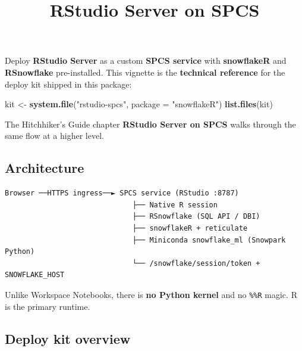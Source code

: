 \documentclass[
]{article}
\title{RStudio Server on SPCS}
\author{}
\date{\vspace{-2.5em}}
\newenvironment{Shaded}{\begin{snugshade}}{\end{snugshade}}
\newcommand{\AttributeTok}[1]{\textcolor[rgb]{0.13,0.29,0.53}{#1}}
\newcommand{\FunctionTok}[1]{\textcolor[rgb]{0.13,0.29,0.53}{\textbf{#1}}}
\newcommand{\NormalTok}[1]{#1}
\newcommand{\OtherTok}[1]{\textcolor[rgb]{0.56,0.35,0.01}{#1}}
\newcommand{\StringTok}[1]{\textcolor[rgb]{0.31,0.60,0.02}{#1}}
\begin{document}
\maketitle

Deploy \textbf{RStudio Server} as a custom \textbf{SPCS service} with
\textbf{snowflakeR} and \textbf{RSnowflake} pre-installed. This vignette
is the \textbf{technical reference} for the deploy kit shipped in this
package:

\begin{Shaded}
\begin{Highlighting}[]
\NormalTok{kit }\OtherTok{\textless{}{-}} \FunctionTok{system.file}\NormalTok{(}\StringTok{"rstudio{-}spcs"}\NormalTok{, }\AttributeTok{package =} \StringTok{"snowflakeR"}\NormalTok{)}
\FunctionTok{list.files}\NormalTok{(kit)}
\end{Highlighting}
\end{Shaded}

The Hitchhiker's Guide chapter \textbf{RStudio Server on SPCS} walks
through the same flow at a higher level.

\subsection{Architecture}\label{architecture}

\begin{verbatim}
Browser ──HTTPS ingress──► SPCS service (RStudio :8787)
                              ├── Native R session
                              ├── RSnowflake (SQL API / DBI)
                              ├── snowflakeR + reticulate
                              ├── Miniconda snowflake_ml (Snowpark Python)
                              └── /snowflake/session/token + SNOWFLAKE_HOST
\end{verbatim}

Unlike Workspace Notebooks, there is \textbf{no Python kernel} and no
\texttt{\%\%R} magic. R is the primary runtime.

\subsection{Deploy kit overview}\label{deploy-kit-overview}
\end{document}
